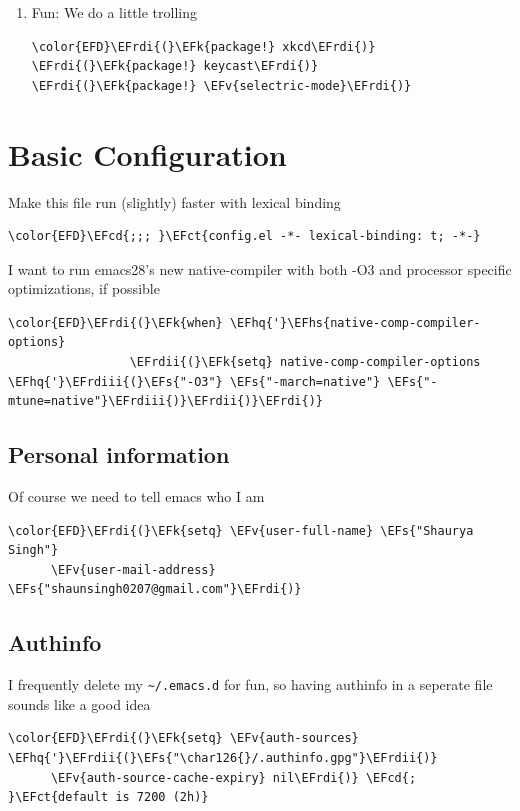 \documentclass{scrartcl}
\newcommand{\EFk}[1]{\textcolor{EFk}{#1}} %
\newcommand{\EFs}[1]{\textcolor{EFs}{#1}} %
\newcommand{\EFct}[1]{\textcolor{EFct}{#1}} %
\newcommand{\EFv}[1]{\textcolor{EFv}{#1}} %
\newcommand{\EFcd}[1]{\textcolor{EFcd}{#1}} %
\newcommand{\EFhq}[1]{\textcolor{EFhq}{#1}} %
\newcommand{\EFhs}[1]{\textcolor{EFhs}{#1}} %
\newcommand{\EFrdi}[1]{\textcolor{EFrdi}{#1}} %
\newcommand{\EFrdii}[1]{\textcolor{EFrdii}{#1}} %
\newcommand{\EFrdiii}[1]{\textcolor{EFrdiii}{#1}} %
\begin{document}
\begin{enumerate}
\item Fun:
\label{sec:orgf79e9c9}
We do a little trolling
\begin{Code}
\begin{Verbatim}[]
\color{EFD}\EFrdi{(}\EFk{package!} xkcd\EFrdi{)}
\EFrdi{(}\EFk{package!} keycast\EFrdi{)}
\EFrdi{(}\EFk{package!} \EFv{selectric-mode}\EFrdi{)}
\end{Verbatim}
\end{Code}
\end{enumerate}

\section{Basic Configuration}
\label{sec:orgf6e4de4}
Make this file run (slightly) faster with lexical binding
\begin{Code}
\begin{Verbatim}[]
\color{EFD}\EFcd{;;; }\EFct{config.el -*- lexical-binding: t; -*-}
\end{Verbatim}
\end{Code}

I want to run emacs28's new native-compiler with both -O3 and processor specific
optimizations, if possible
\begin{Code}
\begin{Verbatim}[]
\color{EFD}\EFrdi{(}\EFk{when} \EFhq{'}\EFhs{native-comp-compiler-options}
                 \EFrdii{(}\EFk{setq} native-comp-compiler-options \EFhq{'}\EFrdiii{(}\EFs{"-O3"} \EFs{"-march=native"} \EFs{"-mtune=native"}\EFrdiii{)}\EFrdii{)}\EFrdi{)}
\end{Verbatim}
\end{Code}

\subsection{Personal information}
\label{sec:org17b3301}
Of course we need to tell emacs who I am
\begin{Code}
\begin{Verbatim}[]
\color{EFD}\EFrdi{(}\EFk{setq} \EFv{user-full-name} \EFs{"Shaurya Singh"}
      \EFv{user-mail-address} \EFs{"shaunsingh0207@gmail.com"}\EFrdi{)}
\end{Verbatim}
\end{Code}

\subsection{Authinfo}
\label{sec:org8c1eb79}
I frequently delete my \texttt{\textasciitilde{}/.emacs.d} for fun, so having authinfo in a seperate file
sounds like a good idea
\begin{Code}
\begin{Verbatim}[]
\color{EFD}\EFrdi{(}\EFk{setq} \EFv{auth-sources} \EFhq{'}\EFrdii{(}\EFs{"\char126{}/.authinfo.gpg"}\EFrdii{)}
      \EFv{auth-source-cache-expiry} nil\EFrdi{)} \EFcd{; }\EFct{default is 7200 (2h)}
\end{Verbatim}
\end{Code}
\end{document}
